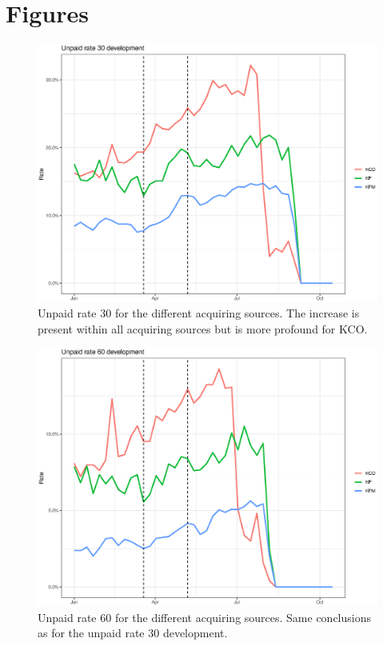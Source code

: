\chapter{Figures} \label{sec:appendixFigures}


\begin{figure}[!ht]
  \centering
  \includegraphics[width=5in,trim={0 0 0 0},clip]{content/figures/rate30_dev_nl_as.eps} 
  \caption{Unpaid rate 30 for the different acquiring sources. The increase is present within all acquiring sources but is more profound for KCO.}
  \label{fig:rate30_dev_as}
\end{figure}

\begin{figure}[!ht]
  \centering
  \includegraphics[width=5in,trim={0 0 0 0},clip]{content/figures/rate60_dev_nl_as.eps} 
  \caption{Unpaid rate 60 for the different acquiring sources. Same conclusions as for the unpaid rate 30 development.}
  \label{fig:rate60_dev_as}
\end{figure}

